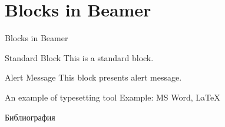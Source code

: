 \documentclass{beamer}
\begin{document}
\section{Blocks in Beamer}
\begin{frame}{Blocks in Beamer}
    \begin{block}{Standard Block}
        This is a standard block.
    \end{block}
    \begin{alertblock}{Alert Message}
        This block presents alert message.
    \end{alertblock}
    \begin{exampleblock}{An example of typesetting tool}
        Example: MS Word, \LaTeX{}
    \end{exampleblock}
\end{frame} 

\begin{frame}{Библиография}

\printbibliography

\end{frame}
\end{document}
